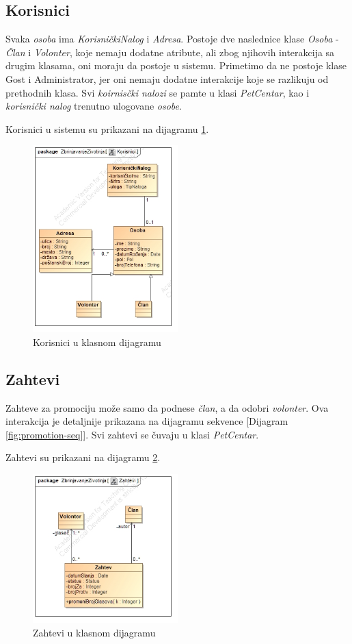 \subsection{Korisnici}
\par Svaka \textit{osoba} ima \textit{KorisničkiNalog} i \textit{Adresa}.
Postoje dve naslednice klase \textit{Osoba} - \textit{Član} i \textit{Volonter}, koje nemaju dodatne atribute, ali zbog njihovih interakcija
sa drugim klasama, oni moraju da postoje u sistemu. Primetimo da ne postoje klase Gost i Administrator, jer oni nemaju dodatne interakcije
koje se razlikuju od prethodnih klasa. Svi \textit{koirnisčki nalozi} se pamte u klasi \textit{PetCentar}, kao i \textit{korisnički nalog} trenutno
ulogovane \textit{osobe}.
\par Korisnici u sistemu su prikazani na dijagramu \ref{fig:users}. 
\begin{figure}[h]
    \centering
    \includegraphics[width=0.5\textwidth, height=0.4\textwidth]{img/users.jpg}
    \caption{Korisnici u klasnom dijagramu}
    \label{fig:users}
\end{figure}
\subsection{Zahtevi}
\par Zahteve za promociju može samo da podnese \textit{član}, a da odobri \textit{volonter}. Ova interakcija je detaljnije prikazana 
na dijagramu sekvence [Dijagram \ref{fig:promotion-seq}]. Svi zahtevi se čuvaju u klasi \textit{PetCentar}.
\par Zahtevi su prikazani na dijagramu \ref{fig:reqs}.
\begin{figure}[h]
    \centering
    \includegraphics[width=0.5\textwidth, height=0.4\textwidth]{img/requests.jpg}
    \caption{Zahtevi u klasnom dijagramu}
    \label{fig:reqs}
\end{figure}
